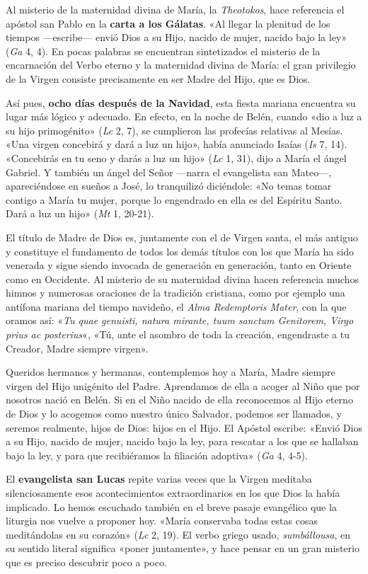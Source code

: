 \documentclass[]{article}
\begin{document}
Al misterio de la maternidad divina de María, la \emph{Theotokos}, hace
referencia el apóstol san Pablo en la \textbf{carta a los Gálatas}. «Al
llegar la plenitud de los tiempos ---escribe--- envió Dios a su Hijo,
nacido de mujer, nacido bajo la ley» (\emph{Ga} 4, 4). En pocas palabras
se encuentran sintetizados el misterio de la encarnación del Verbo
eterno y la maternidad divina de María: el gran privilegio de la Virgen
consiste precisamente en ser Madre del Hijo, que es Dios.

Así pues, \textbf{ocho días después de la Navidad}, esta fiesta mariana
encuentra su lugar más lógico y adecuado. En efecto, en la noche de
Belén, cuando «dio a luz a su hijo primogénito» (\emph{Lc} 2, 7), se
cumplieron las profecías relativas al Mesías. «Una virgen concebirá y
dará a luz un hijo», había anunciado Isaías (\emph{Is} 7, 14).
«Concebirás en tu seno y darás a luz un hijo» (\emph{Lc} 1, 31), dijo a
María el ángel Gabriel. Y también un ángel del Señor ---narra el
evangelista san Mateo---, apareciéndose en sueños a José, lo tranquilizó
diciéndole: «No temas tomar contigo a María tu mujer, porque lo
engendrado en ella es del Espíritu Santo. Dará a luz un hijo» (\emph{Mt}
1, 20-21).

El título de Madre de Dios es, juntamente con el de Virgen santa, el más
antiguo y constituye el fundamento de todos los demás títulos con los
que María ha sido venerada y sigue siendo invocada de generación en
generación, tanto en Oriente como en Occidente. Al misterio de su
maternidad divina hacen referencia muchos himnos y numerosas oraciones
de la tradición cristiana, como por ejemplo una antífona mariana del
tiempo navideño, el \emph{Alma Redemptoris Mater}, con la que oramos
así: «\emph{Tu quae genuisti, natura mirante, tuum sanctum Genitorem,
Virgo prius ac posterius}«, «Tú, ante el asombro de toda la creación,
engendraste a tu Creador, Madre siempre virgen».

Queridos hermanos y hermanas, contemplemos hoy a María, Madre siempre
virgen del Hijo unigénito del Padre. Aprendamos de ella a acoger al Niño
que por nosotros nació en Belén. Si en el Niño nacido de ella
reconocemos al Hijo eterno de Dios y lo acogemos como nuestro único
Salvador, podemos ser llamados, y seremos realmente, hijos de Dios:
hijos en el Hijo. El Apóstol escribe: «Envió Dios a su Hijo, nacido de
mujer, nacido bajo la ley, para rescatar a los que se hallaban bajo la
ley, y para que recibiéramos la filiación adoptiva» (\emph{Ga} 4, 4-5).

El \textbf{evangelista san Lucas} repite varias veces que la Virgen
meditaba silenciosamente esos acontecimientos extraordinarios en los que
Dios la había implicado. Lo hemos escuchado también en el breve pasaje
evangélico que la liturgia nos vuelve a proponer hoy. «María conservaba
todas estas cosas meditándolas en su corazón» (\emph{Lc} 2, 19). El
verbo griego usado, \emph{sumbállousa}, en su sentido literal significa
«poner juntamente», y hace pensar en un gran misterio que es preciso
descubrir poco a poco.
\end{document}
